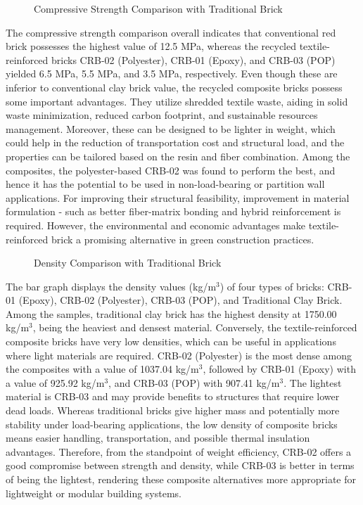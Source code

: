 \begin{figure}[H]
	\begin{minipage}{1\textwidth}
		\centering
		\caption{Compressive Strength Comparison with Traditional Brick }
	\end{minipage}
\end{figure}

The compressive strength comparison overall indicates that conventional red brick possesses the highest value of 12.5 MPa, whereas the recycled textile-reinforced bricks CRB-02 (Polyester), CRB-01 (Epoxy), and CRB-03 (POP) yielded 6.5 MPa, 5.5 MPa, and 3.5 MPa, respectively. Even though these are inferior to conventional clay brick value, the recycled composite bricks possess some important advantages. They utilize shredded textile waste, aiding in solid waste minimization, reduced carbon footprint, and sustainable resources management. Moreover, these can be designed to be lighter in weight, which could help in the reduction of transportation cost and structural load, and the properties can be tailored based on the resin and fiber combination. Among the composites, the polyester-based CRB-02 was found to perform the best, and hence it has the potential to be used in non-load-bearing or partition wall applications. For improving their structural feasibility, improvement in material formulation - such as better fiber-matrix bonding and hybrid reinforcement is required. However, the environmental and economic advantages make textile-reinforced brick a promising alternative in green construction practices.

\begin{figure}[H]
	\begin{minipage}{1\textwidth}
		\centering
		\caption{Density Comparison with Traditional Brick }
	\end{minipage}
\end{figure}

The bar graph displays the density values (kg/m$^3$) of four types of bricks: CRB-01 (Epoxy), CRB-02 (Polyester), CRB-03 (POP), and Traditional Clay Brick. Among the samples, traditional clay brick has the highest density at 1750.00 kg/m$^3$, being the heaviest and densest material. Conversely, the textile-reinforced composite bricks have very low densities, which can be useful in applications where light materials are required. CRB-02 (Polyester) is the most dense among the composites with a value of 1037.04 kg/m$^3$, followed by CRB-01 (Epoxy) with a value of 925.92 kg/m$^3$, and CRB-03 (POP) with 907.41 kg/m$^3$. The lightest material is CRB-03 and may provide benefits to structures that require lower dead loads. Whereas traditional bricks give higher mass and potentially more stability under load-bearing applications, the low density of composite bricks means easier handling, transportation, and possible thermal insulation advantages. Therefore, from the standpoint of weight efficiency, CRB-02 offers a good compromise between strength and density, while CRB-03 is better in terms of being the lightest, rendering these composite alternatives more appropriate for lightweight or modular building systems.

